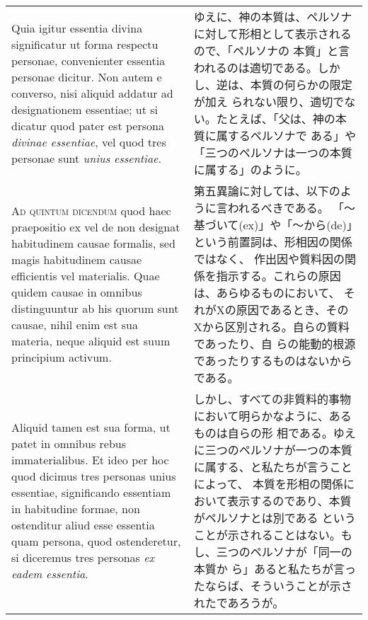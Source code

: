 \documentclass[10pt]{jsarticle} %
\begin{document}
\begin{longtable}{p{21em}p{21em}}
\\

Quia igitur essentia divina significatur
ut forma respectu personae, convenienter essentia personae dicitur. Non
autem e converso, nisi aliquid addatur ad designationem essentiae; ut si
dicatur quod pater est persona {\itshape divinae essentiae}, vel quod tres personae
sunt {\itshape unius essentiae}.


&

ゆえに、神の本質は、ペルソナに対して形相として表示されるので、「ペルソナの
 本質」と言われるのは適切である。しかし、逆は、本質の何らかの限定が加え
 られない限り、適切でない。たとえば、「父は、神の本質に属するペルソナで
 ある」や「三つのペルソナは一つの本質に属する」のように。


\\



{\scshape Ad quintum dicendum} quod haec praepositio ex vel de non designat
habitudinem causae formalis, sed magis habitudinem causae efficientis
vel materialis. Quae quidem causae in omnibus distinguuntur ab his
quorum sunt causae, nihil enim est sua materia, neque aliquid est suum
principium activum. 

&

第五異論に対しては、以下のように言われるべきである。
「〜基づいて(ex)」や「〜から(de)」という前置詞は、形相因の関係ではなく、
 作出因や質料因の関係を指示する。これらの原因は、あらゆるものにおいて、
 それがXの原因であるとき、そのXから区別される。自らの質料であったり、自
 らの能動的根源であったりするものはないからである。

\\



Aliquid tamen est sua forma, ut patet in omnibus
rebus immaterialibus. Et ideo per hoc quod dicimus tres personas unius
essentiae, significando essentiam in habitudine formae, non ostenditur
aliud esse essentia quam persona, quod ostenderetur, si diceremus tres
personas {\itshape ex eadem essentia}.

&

しかし、すべての非質料的事物において明らかなように、あるものは自らの形
 相である。ゆえに三つのペルソナが一つの本質に属する、と私たちが言うことによって、
 本質を形相の関係において表示するのであり、本質がペルソナとは別である
 ということが示されることはない。もし、三つのペルソナが「同一の本質か
 ら」あると私たちが言ったならば、そういうことが示されたであろうが。


\\





\end{longtable}
\end{document}
